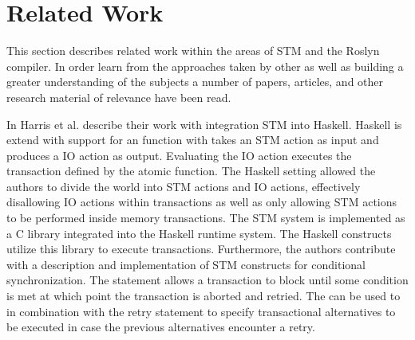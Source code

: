 \section{Related Work}
This section describes related work within the areas of \ac{STM} and the Roslyn compiler. In order learn from the approaches taken by other as well as building a greater understanding of the subjects a number of papers, articles, and other research material of relevance have been read. 

In \cite{harris2005composable} Harris et al. describe their work with integration \ac{STM} into Haskell. Haskell is extend with support for an  function with takes an \ac{STM} action as input and produces a \ac{IO} action as output\cite[p. 51]{harris2005composable}. Evaluating the IO action executes the transaction defined by the atomic function. The Haskell setting allowed the authors to divide the world into \ac{STM} actions and \ac{IO} actions\cite[p. 51]{harris2005composable}, effectively disallowing \ac{IO} actions within transactions as well as only allowing \ac{STM} actions to be performed inside memory transactions. The \ac{STM} system is implemented as a C library integrated into the Haskell runtime system. The Haskell constructs utilize this library to execute transactions\cite[p. 56]{harris2005composable}. Furthermore, the authors contribute with a description and implementation of \ac{STM} constructs for conditional synchronization. The  statement allows a transaction to block until some condition is met at which point the transaction is aborted and retried\cite[p. 52]{harris2005composable}. The  can be used to in combination with the retry statement to specify transactional alternatives to be executed in case the previous alternatives encounter a retry\cite[p. 52]{harris2005composable}.


